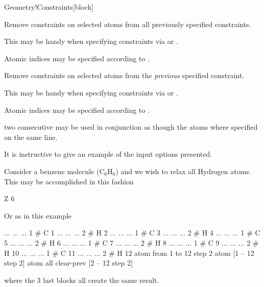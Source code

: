 \begin{fdfentry}{Geometry!Constraints}[block]
\begin{fdfoptions}
    \option[clear]%
    Remove constraints on selected atoms from all previously specified
    constraints.

    This may be handy when specifying constraints via  or
    .

    Atomic indices may be specified according to .

    Remove constraints on selected atoms from the \emph{previous} specified
    constraint.

    This may be handy when specifying constraints via  or
    .

    Atomic indices may be specified according to .

    \note two consecutive  may be used in conjunction
    as though the atoms where specified on the same line.

  \end{fdfoptions}

  It is instructive to give an example of the input options presented.

  Consider a benzene molecule ($\mathrm{C}_6\mathrm{H}_6$) and we wish
  to relax all Hydrogen atoms. This may be accomplished in this fashion
  \begin{fdfexample}
      Z 6
  \end{fdfexample}
  Or as in this example
  \begin{fdfexample}
      ... ... ... 1   # C 1
      ... ... ... 2   # H 2
      ... ... ... 1   # C 3
      ... ... ... 2   # H 4
      ... ... ... 1   # C 5
      ... ... ... 2   # H 6
      ... ... ... 1   # C 7
      ... ... ... 2   # H 8
      ... ... ... 1   # C 9
      ... ... ... 2   # H 10
      ... ... ... 1   # C 11
      ... ... ... 2   # H 12
      atom from 1 to 12 step 2
      atom [1 -- 12 step 2]
      atom all
      clear-prev [2 -- 12 step 2]
  \end{fdfexample}
  where the 3 last blocks all create the same result.


\end{fdfentry}
